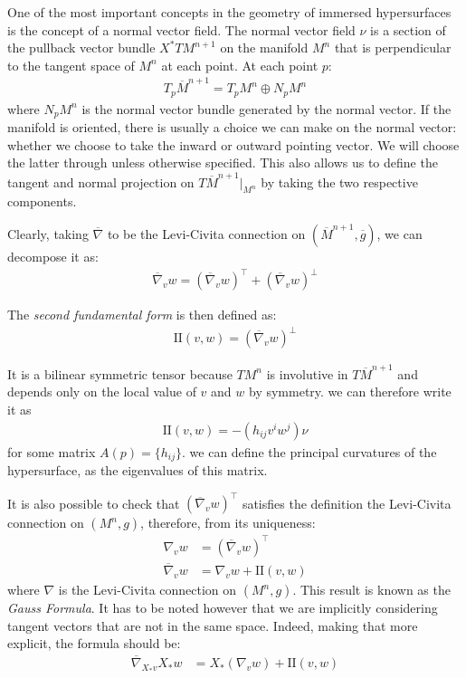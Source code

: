 One of the most important concepts in the geometry of immersed hypersurfaces is the concept of a normal vector field. The normal vector field $\nu$ is a section of the pullback vector bundle $X^* TM^{n+1}$ on the manifold $M^n$ that is perpendicular to the tangent space of $M^n$ at each point. At each point $p$:
\begin{align*}
	T_p\overline{M}^{n+1}=T_pM^{n}\oplus N_pM^{n}
\end{align*} 
where $N_pM^{n}$ is the normal vector bundle generated by the normal vector. If the manifold is oriented, there is usually a choice we can make on the normal vector: whether we choose to take the inward or outward pointing vector. We will choose the latter through unless otherwise specified. This also allows us to define the tangent and normal projection on $T\overline{M}^{n+1}|_{M^n}$ by taking the two respective components. 

Clearly, taking $\overline{\nabla}$ to be the Levi-Civita connection on $(\overline{M}^{n+1}, \overline{g})$, we can decompose it as:
\begin{align*}
	\overline{\nabla}_v w = (\overline{\nabla}_v w )^\top +  (\overline{\nabla}_v w )^\bot
\end{align*} 

\begin{defin}
	The {\em second fundamental form} is then defined as: 
	\begin{align*}
	 	\mathrm{I\!I} (v, w) =  (\overline{\nabla}_v w )^\bot 	
	\end{align*} 
\end{defin}
It is a bilinear symmetric tensor because $TM^n$ is involutive in $T\overline{M}^{n+1}$ and depends only on the local value of $v$ and $w$ by symmetry. we can therefore write it as
\begin{align*}
	\mathrm{I\!I} (v, w) = -(h_{ij}v^iw^j)\nu
\end{align*} 
for some matrix $A(p)=\{h_{ij}\}$. we can define the principal curvatures of the hypersurface, as the eigenvalues of this matrix.

It is also possible to check that $(\overline{\nabla}_v w )^\top$ satisfies the definition the Levi-Civita connection on $(M^n, g)$, therefore, from its uniqueness:
\begin{align*}
	\nabla_v w &=  (\overline{\nabla}_v w )^\top	\\
	\overline{\nabla}_v w &= \nabla_v w  + \mathrm{I\!I} (v, w) 
\end{align*} 
where $\nabla$ is the Levi-Civita connection on $(M^n, g)$. This result is known as the {\em Gauss Formula}. It has to be noted however that we are implicitly considering tangent vectors that are not in the same space. Indeed, making that more explicit, the formula should be:
\begin{align*}
	\overline{\nabla}_{X_*v} X_* w &= X_* (\nabla_v w)  + \mathrm{I\!I} (v, w) 
\end{align*}

